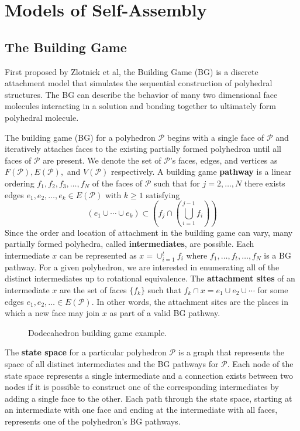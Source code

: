 \section{Models of Self-Assembly}
\subsection{The Building Game}

First proposed by Zlotnick et al, the Building Game (BG) is a discrete attachment model that simulates the sequential construction of polyhedral structures. The BG can describe the behavior of many two dimensional face molecules interacting in a solution and bonding together to ultimately form polyhedral molecule.

 The building game (BG) for a polyhedron $\mathcal{P}$ begins with a single face of $\mathcal{P}$ and iteratively attaches faces to the existing partially formed polyhedron until all faces of $\mathcal{P}$ are present. We denote the set of $\mathcal{P}$'s faces, edges, and vertices as $F(\mathcal{P}),E(\mathcal{P}),$ and $V(\mathcal{P})$ respectively. A building game \textbf{pathway} is a linear ordering $f_1,f_2,f_3,\ldots,f_N$ of the faces of $\mathcal{P}$ such that for $j = 2,\ldots,N$ there exists edges $e_1,e_2,\ldots,e_k \in E(\mathcal{P})$ with  $k \geq 1$ satisfying
$$\left(e_1\cup\cdots\cup e_k \right)\subset \left(f_j\cap\left(\bigcup_{i=1}^{j-1}f_i\right)\right)$$
Since the order and location of attachment in the building game can vary, many partially formed polyhedra, called \textbf{intermediates}, are possible. Each intermediate $x$ can be represented as $x = \cup_{i=1}^tf_i$ where $f_1,\ldots,f_t,\ldots,f_N$ is a BG pathway. For a given polyhedron, we are interested in enumerating all of the distinct intermediates up to rotational equivalence. The  \textbf{attachment sites} of an intermediate $x$ are the set of faces $\{f_k\}$ such that $f_k\cap x = e_1\cup e_2 \cup \cdots$ for some edges $e_1,e_2,\ldots \in E(\mathcal{P})$. In other words, the attachment sites are the places in which a new face may join $x$ as part of a valid BG pathway.

\begin{figure}[!h]
\caption{Dodecahedron building game example.}
\label{fig:bg}
\end{figure}

The \textbf{state space} for a particular polyhedron $\mathcal{P}$ is a graph that represents the space of all distinct intermediates and the BG pathways for $\mathcal{P}$. Each node of the state space represents a single intermediate and a connection exists between two nodes if it is possible to construct one of the corresponding intermediates by adding a single face to the other. Each path through the state space, starting at an intermediate with one face and ending at the intermediate with all faces, represents one of the polyhedron's BG pathways. 

